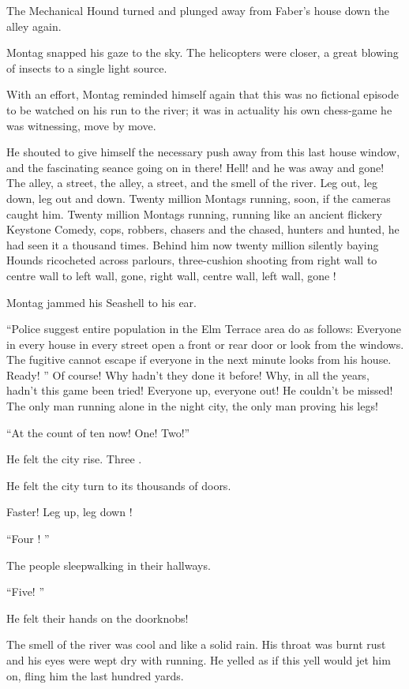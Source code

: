 \documentclass[11pt,openany]{book}
\begin{document}
The Mechanical Hound turned and plunged away from Faber's house down the alley again.

Montag snapped his gaze to the sky. The helicopters were closer, a great blowing of insects to a single light source.

With an effort, Montag reminded himself again that this was no fictional episode to be watched on his run to the river; it was in actuality his own chess-game he was witnessing, move by move.

He shouted to give himself the necessary push away from this last house window, and the fascinating seance going on in there! Hell! and he was away and gone! The alley, a street, the alley, a street, and the smell of the river. Leg out, leg down, leg out and down. Twenty million Montags running, soon, if the cameras caught him. Twenty million Montags running, running like an ancient flickery Keystone Comedy, cops, robbers, chasers and the chased, hunters and hunted, he had seen it a thousand times. Behind him now twenty million silently baying Hounds ricocheted across parlours, three-cushion shooting from right wall to centre wall to left wall, gone, right wall, centre wall, left wall, gone !

Montag jammed his Seashell to his ear.

``Police suggest entire population in the Elm Terrace area do as follows: Everyone in every house in every street open a front or rear door or look from the windows. The fugitive cannot escape if everyone in the next minute looks from his house. Ready! '' Of course! Why hadn't they done it before! Why, in all the years, hadn't this game been tried! Everyone up, everyone out! He couldn't be missed! The only man running alone in the night city, the only man proving his legs!

``At the count of ten now! One! Two!''

He felt the city rise. Three .

He felt the city turn to its thousands of doors.

Faster! Leg up, leg down !

``Four ! ''

The people sleepwalking in their hallways.

``Five! ''

He felt their hands on the doorknobs!

The smell of the river was cool and like a solid rain. His throat was burnt rust and his eyes were wept dry with running. He yelled as if this yell would jet him on, fling him the last hundred yards.
\end{document}
